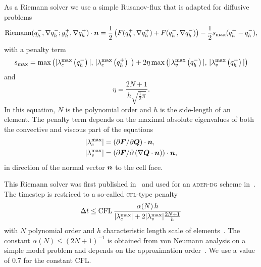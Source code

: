 As a Riemann solver we use a simple Rusanov-flux that is adapted for diffusive problems
\begin{equation}
  \label{eq:rusanov-flux}
  \operatorname{Riemann}(q_h^-, \nabla q_h^-; g_h^+, \nabla q_h^+) \cdot \bm{n} =
  \frac{1}{2} \left(
    F(q_h^+, \nabla q_h^+) +
    F(q_h^-, \nabla q_h^-)
  \right) -
  \frac{1}{2} s_\text{max} (q_h^+ - q_h^-),
\end{equation}
with a penalty term
\begin{equation}
  \label{eq:parabolic-penalty}
  s_\text{max}  = \max \left(
\maxConvEigen[q_h^-], \, \maxConvEigen[q_h^+]
\right) +
2 \eta \max \left(
\maxViscEigen[q_h^-], \, \maxViscEigen[q_h^+]
\right)
\end{equation}
and
\begin{equation}
  \eta = \frac{2N+1}{h \sqrt{\frac{1}{2} \pi}}.
\end{equation}
In this equation, $N$ is the polynomial order and $h$ is the side-length of an element.
The penalty term depends on the maximal absolute eigenvalues of both the convective and viscous part of the equations
\begin{align}
  \begin{split}
    \maxConvEigen &= \left( \partial \bm{F}/\partial \bm{Q}\right) \cdot \normal,\\
    \maxViscEigen &= \left( \partial \bm{F}/\partial \left( \nabla \bm{Q} \cdot \normal \right)\right) \cdot \normal,
  \end{split}
\end{align}
in direction of the normal vector $\bm{n}$ to the cell face. 

This Riemann solver was first published in~\cite{gassner2008discontinuous} and used for an \textsc{ader-dg} scheme in~\cite{dumbser2010arbitrary}.
The timestep is restriced to a so-called \textsc{cfl}-type penalty
\begin{equation}\label{eq:cfl-aderdg}
 \Delta t \leq  \text{CFL} \, \frac{\alpha(N) \, h}{\maxConvEigen + 2 \maxViscEigen \frac{2N+1}{h}}
\end{equation}
with $N$ polynomial order and $h$ characteristic length scale of elements~\cite{dumbser2010arbitrary,gassner2008discontinuous}.
The constant $\alpha(N) \leq {\left( 2N+1  \right)}^{-1}$ is obtained from von Neumann analysis on a simple model problem and depends on the approximation order~\cite{dumbser2008unified}.
We use a value of $0.7$ for the constant $\text{CFL}$.


